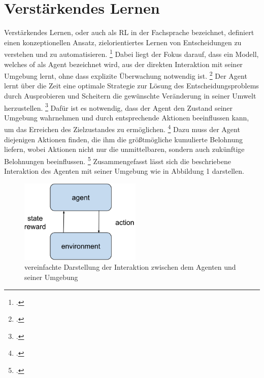 \section{Verstärkendes Lernen}
Verstärkendes Lernen, oder auch als RL in der Fachsprache bezeichnet, definiert einen konzeptionellen Ansatz, zielorientiertes Lernen von Entscheidungen zu verstehen und zu automatisieren. \footcite[Vgl.][S. 13]{Sutton.2018}
Dabei liegt der Fokus darauf, dass ein Modell, welches of als Agent bezeichnet wird, aus der direkten Interaktion mit seiner Umgebung lernt, ohne dass explizite Überwachung notwendig ist. \footcite[Vgl.][S. 13]{Sutton.2018}
Der Agent lernt über die Zeit eine optimale Strategie zur Lösung des Entscheidungsproblems durch Ausprobieren und Scheitern die gewünschte Veränderung in seiner Umwelt herzustellen. \footcite[Vgl.][S. 4]{Li.2019}
Dafür ist es notwendig, dass der Agent den Zustand seiner Umgebung wahrnehmen und durch entsprechende Aktionen beeinflussen kann, um das Erreichen des Zielzustandes zu ermöglichen. \footcite[Vgl.][S. 2]{Sutton.2018}
Dazu muss der Agent diejenigen Aktionen finden, die ihm die größtmögliche kumulierte Belohnung liefern, wobei Aktionen nicht nur die unmittelbaren, sondern auch zukünftige Belohnungen beeinflussen. \footcite[Vgl.][S. 1]{Sutton.2018}
Zusammengefasst lässt sich die beschriebene Interaktion des Agenten mit seiner Umgebung wie in Abbildung 1 darstellen.
\begin{figure}[htb]
    \centering
    \includegraphics[height=4cm]{lib/graphics/Agent-Environment interaction.png}
    \caption[vereinfachte Darstellung der Interaktion zwischen dem Agenten und seiner Umgebung]{vereinfachte Darstellung der Interaktion zwischen dem Agenten und seiner Umgebung\footnotemark}
    \label{abb:Agent-Environment interaction}
\end{figure}

